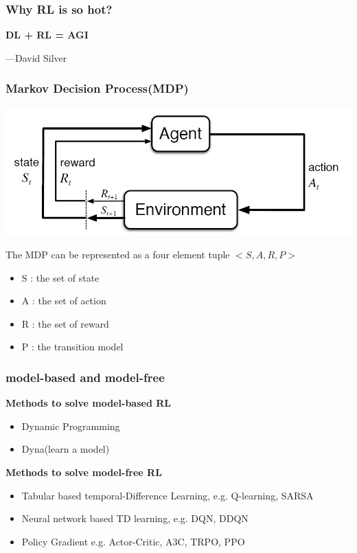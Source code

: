 \documentclass[notheorems, aspectratio=54]{beamer}
\begin{document}
\begin{frame}
  \frametitle{Why RL is so hot?}
  \centering
  \huge{\textbf{DL + RL = AGI}} \\
  \begin{flushright}
  \large{---David Silver}
  \end{flushright}
\end{frame}
\begin{frame}
  \frametitle{Markov Decision Process(MDP)}
  \begin{minipage}{0.45\textwidth}
    \includegraphics[width=\textwidth ]{mdp.png}
  \end{minipage}
  \hspace{0.05\linewidth}
  \begin{minipage}{0.45\textwidth}
  The MDP can be represented as a four element tuple $<S, A, R, P>$ 
  \begin{itemize}
    \item S : the set of state
    \item A : the set of action
    \item R : the set of reward
    \item P : the transition model
  \end{itemize}
  \end{minipage}

\end{frame}

\begin{frame}
  \frametitle{model-based and model-free}
  \textbf{Methods to solve model-based RL}
    \begin{itemize}
      \item Dynamic Programming
      \item Dyna(learn a model)
    \end{itemize}
  \textbf{Methods to solve model-free RL}
    \begin{itemize}
      \item Tabular based temporal-Difference Learning, e.g. Q-learning, SARSA
      \item Neural network based TD learning, e.g. DQN, DDQN
      \item Policy Gradient e.g. Actor-Critic, A3C, TRPO, PPO
    \end{itemize}
\end{frame}
\end{document}
